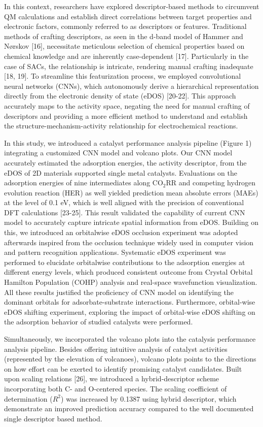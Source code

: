 In this context, researchers have explored descriptor-based methods to circumvent QM calculations and establish direct correlations between target properties and electronic factors, commonly referred to as descriptors or features.
Traditional methods of crafting descriptors, as seen in the d-band model of Hammer and Nørskov [16], necessitate meticulous selection of chemical properties based on chemical knowledge and are inherently case-dependent [17].
Particularly in the case of SACs, the relationship is intricate, rendering manual crafting inadequate [18, 19].
To streamline this featurization process, we employed convolutional neural networks (CNNs), which autonomously derive a hierarchical representation directly from the electronic density of state (eDOS) [20-22].
This approach accurately maps to the activity space, negating the need for manual crafting of descriptors and providing a more efficient method to understand and establish the structure-mechanism-activity relationship for electrochemical reactions.

In this study, we introduced a catalyst performance analysis pipeline (Figure 1) integrating a customized CNN model and volcano plots.
Our CNN model accurately estimated the adsorption energies, the activity descriptor, from the eDOS of 2D materials supported single metal catalysts.
Evaluations on the adsorption energies of nine intermediates along CO$_2$RR and competing hydrogen evolution reaction (HER) as well yielded prediction mean absolute errors (MAEs) at the level of 0.1 eV, which is well aligned with the precision of conventional DFT calculations [23-25].
This result validated the capability of current CNN model to accurately capture intricate spatial information from eDOS.
Building on this, we introduced an orbitalwise eDOS occlusion experiment was adopted afterwards inspired from the occlusion technique widely used in computer vision and pattern recognition applications.
Systematic eDOS experiment was performed to elucidate orbitalwise contributions to the adsorption energies at different energy levels, which produced consistent outcome from Crystal Orbital Hamilton Population (COHP) analysis and real-space wavefunction visualization.
All these results justified the proficiency of CNN model on identifying the dominant orbitals for adsorbate-substrate interactions.
Furthermore, orbital-wise eDOS shifting experiment, exploring the impact of orbital-wise eDOS shifting on the adsorption behavior of studied catalysts were performed.

Simultaneously, we incorporated the volcano plots into the catalysis performance analysis pipeline.
Besides offering intuitive analysis of catalyst activities (represented by the elevation of volcanoes), volcano plots points to the directions on how effort can be exerted to identify promising catalyst candidates.
Built upon scaling relations [26], we introduced a hybrid-descriptor scheme incorporating both C- and O-centered species.
The scaling coefficient of determination ($R^2$) was increased by 0.1387 using hybrid descriptor, which demonstrate an improved prediction accuracy compared to the well documented single descriptor based method.

